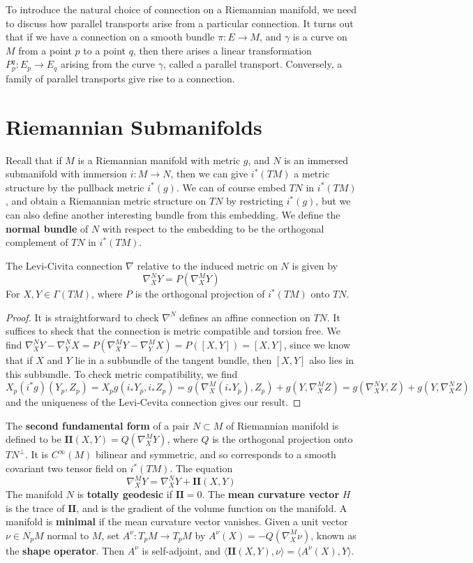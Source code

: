 To introduce the natural choice of connection on a Riemannian manifold, we need to discuss how parallel transports arise from a particular connection. It turns out that if we have a connection on a smooth bundle $\pi: E \to M$, and $\gamma$ is a curve on $M$ from a point $p$ to a point $q$, then there arises a linear transformation $P_p^q: E_p \to E_q$ arising from the curve $\gamma$, called a parallel transport. Conversely, a family of parallel transports give rise to a connection.

\section{Riemannian Submanifolds}

Recall that if $M$ is a Riemannian manifold with metric $g$, and $N$ is an immersed submanifold with immersion $i: M \to N$, then we can give $i^*(TM)$ a metric structure by the pullback metric $i^*(g)$. We can of course embed $TN$ in $i^*(TM)$, and obtain a Riemannian metric structure on $TN$ by restricting $i^*(g)$, but we can also define another interesting bundle from this embedding. We define the {\bf normal bundle} of $N$ with respect to the embedding to be the orthogonal complement of $TN$ in $i^*(TM)$.

\begin{theorem}
    The Levi-Civita connection $\nabla$ relative to the induced metric on $N$ is given by
    \[ \nabla^N_X Y = P(\nabla^M_X Y) \]
    For $X,Y \in \Gamma(TM)$, where $P$ is the orthogonal projection of $i^*(TM)$ onto $TN$.
\end{theorem}
\begin{proof}
    It is straightforward to check $\nabla^N$ defines an affine connection on $TN$. It suffices to sheck that the connection is metric compatible and torsion free. We find $\nabla^N_X Y - \nabla^N_Y X = P(\nabla^M_X Y - \nabla^M_Y X) = P([X,Y]) = [X,Y]$, since we know that if $X$ and $Y$ lie in a subbundle of the tangent bundle, then $[X,Y]$ also lies in this subbundle. To check metric compatibility, we find
    \[ X_p (i^*g)(Y_p,Z_p) = X_p g(i_* Y_p, i_* Z_p) = g(\nabla^M_X (i_* Y_p), Z_p) + g(Y, \nabla^M_X Z) = g(\nabla^N_X Y, Z) + g(Y, \nabla^N_X Z) \]
    and the uniqueness of the Levi-Cevita connection gives our result.
\end{proof}

The {\bf second fundamental form} of a pair $N \subset M$ of Riemannian manifold is defined to be $\mathbf{II}(X,Y) = Q(\nabla^M_X Y)$, where $Q$ is the orthogonal projection onto $TN^\perp$. It is $C^\infty(M)$ bilinear and symmetric, and so corresponds to a smooth covariant two tensor field on $i^*(TM)$. The equation
%
\[ \nabla^M_X Y = \nabla^N_X Y + \mathbf{II}(X,Y) \]
%
The manifold $N$ is {\bf totally geodesic} if $\mathbf{II} = 0$. The {\bf mean curvature vector} $H$ is the trace of $\mathbf{II}$, and is the gradient of the volume function on the manifold. A manifold is {\bf minimal} if the mean curvature vector vanishes. Given a unit vector $\nu \in N_p M$ normal to $M$, set $A^\nu: T_p M \to T_p M$ by $A^\nu(X) = -Q(\nabla^M_X \nu)$, known as the {\bf shape operator}. Then $A^\nu$ is self-adjoint, and $\langle \mathbf{II}(X,Y), \nu \rangle = \langle A^\nu(X), Y \rangle$.

